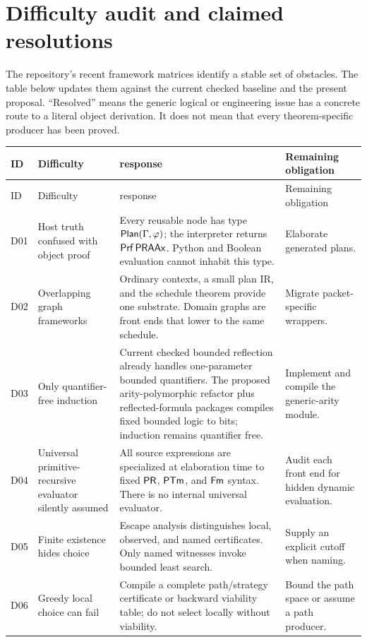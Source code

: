 \section{Difficulty audit and claimed resolutions}\label{sec:difficulties}

The repository's recent framework matrices identify a stable set of obstacles.  The table below
updates them against the current checked baseline and the present proposal.  ``Resolved'' means the
generic logical or engineering issue has a concrete route to a literal object derivation.  It does
not mean that every theorem-specific producer has been proved.

\begingroup
\small
\setlength{\tabcolsep}{2.8pt}
\begin{longtable}{P{0.05\textwidth}P{0.22\textwidth}P{0.43\textwidth}P{0.25\textwidth}}
\toprule
ID & Difficulty & \TAPIR{} response & Remaining obligation \\
\midrule
\endfirsthead
\toprule
ID & Difficulty & \TAPIR{} response & Remaining obligation \\
\midrule
\endhead
D01 & Host truth confused with object proof & Every reusable node has type \(\mathsf{Plan}(\Gamma,\varphi)\); the interpreter returns \(\mathsf{Prf}\,\mathsf{PRAAx}\). Python and Boolean evaluation cannot inhabit this type. & Elaborate generated plans. \\
D02 & Overlapping graph frameworks & Ordinary contexts, a small plan IR, and the schedule theorem provide one substrate. Domain graphs are front ends that lower to the same schedule. & Migrate packet-specific wrappers. \\
D03 & Only quantifier-free induction & Current checked bounded reflection already handles one-parameter bounded quantifiers. The proposed arity-polymorphic refactor plus reflected-formula packages compiles fixed bounded logic to bits; induction remains quantifier free. & Implement and compile the generic-arity module. \\
D04 & Universal primitive-recursive evaluator silently assumed & All source expressions are specialized at elaboration time to fixed \(\mathsf{PR}\), \(\mathsf{PTm}\), and \(\mathsf{Fm}\) syntax. There is no internal universal evaluator. & Audit each front end for hidden dynamic evaluation. \\
D05 & Finite existence hides choice & Escape analysis distinguishes local, observed, and named certificates. Only named witnesses invoke bounded least search. & Supply an explicit cutoff when naming. \\
D06 & Greedy local choice can fail & Compile a complete path/strategy certificate or backward viability table; do not select locally without viability. & Bound the path space or assume a path producer. \\

\end{longtable}
